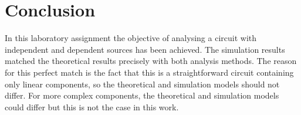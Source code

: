 \section{Conclusion}
\label{sec:conclusion}

In this laboratory assignment the objective of analysing a circuit with independent and
dependent sources has been
achieved. The simulation results matched the theoretical results
precisely with both analysis methods. The reason for this perfect match is the fact that this is a
straightforward circuit containing only linear components, so the theoretical
and simulation models should not differ. For more complex components, the
theoretical and simulation models could differ but this is not the case in this
work.
